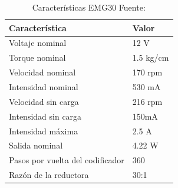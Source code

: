 \begin{table}[H]
    \centering
    \caption{Características EMG30 Fuente:\cite{EMG30datasheet}}\label{tab:EMG30specifications}
    \begin{tabular}{|l|l|}
        \hline
        Característica & Valor\\
        \hline
        Voltaje nominal & 12 V\\
        \hline
        Torque nominal & 1.5 kg/cm\\
        \hline
        Velocidad nominal & 170 rpm\\
        \hline
        Intensidad nominal & 530 mA\\
        \hline
        Velocidad sin carga& 216 rpm\\
        \hline
        Intensidad sin carga& 150mA\\
        \hline
        Intensidad máxima& 2.5 A\\
        \hline
        Salida nominal & 4.22 W\\
        \hline
        Pasos por vuelta del codificador& 360 \\
        \hline
        Razón de la reductora & 30:1\\
        \hline
    \end{tabular}
\end{table}



